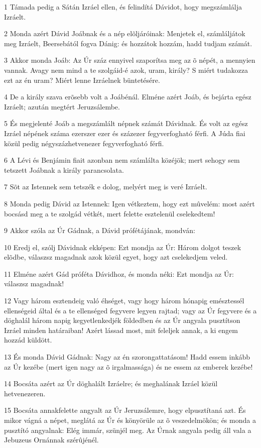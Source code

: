 \par 1 Támada pedig a Sátán Izráel ellen, és felindítá Dávidot, hogy megszámlálja Izráelt.
\par 2 Monda azért Dávid Joábnak és a nép elõljáróinak: Menjetek el, számláljátok meg Izráelt, Beersebától fogva Dánig: és hozzátok hozzám, hadd tudjam számát.
\par 3 Akkor monda Joáb: Az Úr száz ennyivel szaporítsa meg az õ népét, a mennyien vannak. Avagy nem mind a te szolgáid-é azok, uram, király? S miért tudakozza ezt az én uram? Miért lenne Izráelnek  büntetésére.
\par 4 De a király szava erõsebb volt a Joábénál. Elméne azért Joáb, és bejárta egész Izráelt; azután megtért Jeruzsálembe.
\par 5 És megjelenté Joáb a megszámlált népnek számát Dávidnak. És volt az egész Izráel népének száma ezerszer ezer és százezer fegyverfogható férfi. A Júda fiai közül pedig négyszázhetvenezer fegyverfogható férfi.
\par 6 A Lévi és Benjámin fiait azonban nem számlálta közéjök; mert sehogy sem tetszett Joábnak a király parancsolata.
\par 7 Sõt az Istennek sem tetszék e dolog, melyért meg is veré Izráelt.
\par 8 Monda pedig Dávid az Istennek: Igen vétkeztem, hogy ezt mûvelém: most azért bocsásd meg a te szolgád vétkét, mert felette esztelenül cselekedtem!
\par 9 Akkor szóla az Úr Gádnak, a Dávid prófétájának, mondván:
\par 10 Eredj el, szólj Dávidnak ekképen: Ezt mondja az Úr: Három dolgot teszek elõdbe, válaszsz magadnak azok közül egyet, hogy azt cselekedjem veled.
\par 11 Elméne azért Gád próféta Dávidhoz, és monda néki: Ezt mondja az Úr: válaszsz magadnak!
\par 12 Vagy három esztendeig való éhséget, vagy hogy három hónapig emésztessél ellenségeid által és a te ellenséged fegyvere legyen rajtad; vagy az Úr fegyvere és a döghalál három napig kegyetlenkedjék földedben és az Úr angyala pusztítson Izráel minden határaiban! Azért lássad most, mit feleljek annak, a ki engem hozzád küldött.
\par 13 És monda Dávid Gádnak: Nagy az én szorongattatásom! Hadd essem inkább az Úr kezébe (mert igen nagy az õ irgalmassága) és ne essem az emberek kezébe!
\par 14 Bocsáta azért az Úr döghalált Izráelre; és meghalának Izráel közül hetvenezeren.
\par 15 Bocsáta annakfelette angyalt az Úr Jeruzsálemre, hogy elpusztítaná azt. És mikor vágná a népet, meglátá az Úr és könyörüle az õ veszedelmökön; és monda a pusztító angyalnak: Elég immár, szünjél meg. Az Úrnak angyala pedig áll vala a Jebuzeus  Ornánnak szérûjénél.
